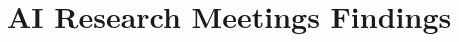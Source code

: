 %
%

%
%
%
%

\graphicspath{{images/controls/}{../images/controls/}}

\section{AI Research Meetings Findings}
\newpage

\newpage

\newpage

\newpage
